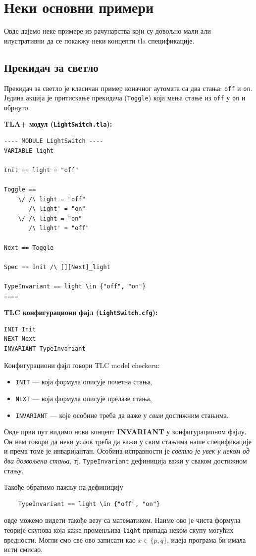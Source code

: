 \section{Неки основни примери}
Овде дајемо неке примере из рачунарства који су довољно мали али илустративни да се покакжу неки концепти tla
спецификације.

\subsection{Прекидач за светло}
\begin{primer}
Прекидач за светло је класичан пример коначног аутомата са два стања: \texttt{off} и \texttt{on}.
Једина акција је притискање прекидача (\texttt{Toggle}) која мења стање из \texttt{off} у \texttt{on} и обрнуто.

\textbf{TLA+ модул (\texttt{LightSwitch.tla}):}
\begin{lstlisting}
---- MODULE LightSwitch ----
VARIABLE light

Init == light = "off"

Toggle ==
    \/ /\ light = "off"
       /\ light' = "on"
    \/ /\ light = "on"
       /\ light' = "off"

Next == Toggle

Spec == Init /\ [][Next]_light

TypeInvariant == light \in {"off", "on"}
====
\end{lstlisting}


\textbf{TLC конфигурациони фајл (\texttt{LightSwitch.cfg}):}
\begin{lstlisting}
INIT Init
NEXT Next
INVARIANT TypeInvariant
\end{lstlisting}

Конфигурациони фајл говори TLC model checkeru:
\begin{itemize}
    \item \texttt{INIT} --- која формула описује почетна стања,
    \item \texttt{NEXT} --- која формула описује прелазе стања,
    \item \texttt{INVARIANT} --- које особине треба да важе у \emph{свим} достижним стањима.
\end{itemize}
Овде први пут видимо нови концепт \textbf{INVARIANT} у конфигурационом фајлу. Он нам говори да неки услов
треба да важи у свим стањима наше спецификације и према томе је инваријантан. 
Особина исправности је \textit{светло је увек у неком од два дозвољена стања}, тј. \texttt{TypeInvariant} дефиниција важи у сваком достижном стању.
    
Такође обратимо пажњу на дефиницију 
\begin{lstlisting}
    TypeInvariant == light \in {"off", "on"}
\end{lstlisting}
овде можемо видети такође везу са математиком. Наиме ово је чиста формула теорије скупова која каже променљива \texttt{light}
припада неком скупу могућих вредности. Могли смо све ово записати као $x \in \{p, q\}$, идеја програма би имала исти смисао.
\end{primer}

